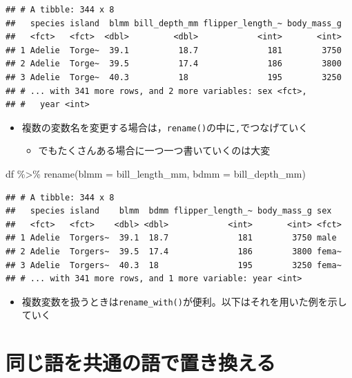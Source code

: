 \documentclass[
  xelatex,ja=standard, b5paper]{bxjsbook}
\newenvironment{Shaded}{\begin{snugshade}}{\end{snugshade}}
\newcommand{\AttributeTok}[1]{\textcolor[rgb]{0.77,0.63,0.00}{#1}}
\newcommand{\FunctionTok}[1]{\textcolor[rgb]{0.00,0.00,0.00}{#1}}
\newcommand{\NormalTok}[1]{#1}
\newcommand{\SpecialCharTok}[1]{\textcolor[rgb]{0.00,0.00,0.00}{#1}}
\providecommand{\tightlist}{%
  \setlength{\itemsep}{0pt}\setlength{\parskip}{0pt}}
\begin{document}
\begin{verbatim}
## # A tibble: 344 x 8
##   species island  blmm bill_depth_mm flipper_length_~ body_mass_g
##   <fct>   <fct>  <dbl>         <dbl>            <int>       <int>
## 1 Adelie  Torge~  39.1          18.7              181        3750
## 2 Adelie  Torge~  39.5          17.4              186        3800
## 3 Adelie  Torge~  40.3          18                195        3250
## # ... with 341 more rows, and 2 more variables: sex <fct>,
## #   year <int>
\end{verbatim}

\begin{itemize}
\tightlist
\item
  複数の変数名を変更する場合は，\texttt{rename()}の中に\texttt{,}でつなげていく

  \begin{itemize}
  \tightlist
  \item
    でもたくさんある場合に一つ一つ書いていくのは大変
  \end{itemize}
\end{itemize}

\begin{Shaded}
\begin{Highlighting}[]
\NormalTok{df }\SpecialCharTok{\%\textgreater{}\%} 
  \FunctionTok{rename}\NormalTok{(}\AttributeTok{blmm =}\NormalTok{ bill\_length\_mm,}
         \AttributeTok{bdmm =}\NormalTok{ bill\_depth\_mm)}
\end{Highlighting}
\end{Shaded}

\begin{verbatim}
## # A tibble: 344 x 8
##   species island    blmm  bdmm flipper_length_~ body_mass_g sex  
##   <fct>   <fct>    <dbl> <dbl>            <int>       <int> <fct>
## 1 Adelie  Torgers~  39.1  18.7              181        3750 male 
## 2 Adelie  Torgers~  39.5  17.4              186        3800 fema~
## 3 Adelie  Torgers~  40.3  18                195        3250 fema~
## # ... with 341 more rows, and 1 more variable: year <int>
\end{verbatim}

\begin{itemize}
\tightlist
\item
  複数変数を扱うときは\texttt{rename\_with()}が便利。以下はそれを用いた例を示していく
\end{itemize}

\hypertarget{rename-samew}{%
\section{同じ語を共通の語で置き換える}\label{rename-samew}}
\end{document}
